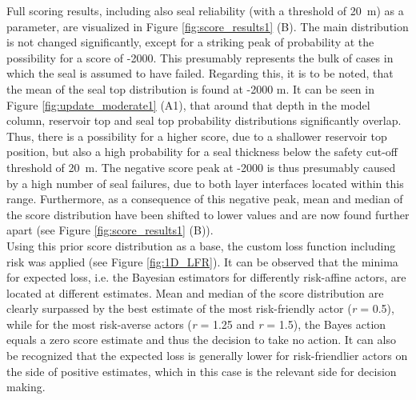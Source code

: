 			Full scoring results, including also seal reliability (with a threshold of 20~m) as a parameter, are visualized in Figure \ref{fig:score_results1} (B). The main distribution is not changed significantly, except for a striking peak of probability at the possibility for a score of -2000. This presumably represents the bulk of cases in which the seal is assumed to have failed. Regarding this, it is to be noted, that the mean of the seal top distribution is found at -2000 m. It can be seen in Figure \ref{fig:update_moderate1} (A1), that around that depth in the model column, reservoir top and seal top probability distributions significantly overlap. Thus, there is a possibility for a higher score, due to a shallower reservoir top position, but also a high probability for a seal thickness below the safety cut-off threshold of 20~m. The negative score peak at -2000 is thus presumably caused by a high number of seal failures, due to both layer interfaces located within this range. Furthermore, as a consequence of this negative peak, mean and median of the score distribution have been shifted to lower values and are now found further apart (see Figure \ref{fig:score_results1} (B)).\\
			Using this prior score distribution as a base, the custom loss function including risk was applied (see Figure \ref{fig:1D_LFR}). It can be observed that the minima for expected loss, i.e. the Bayesian estimators for differently risk-affine actors, are located at different estimates. Mean and median of the score distribution are clearly surpassed by the best estimate of the most risk-friendly actor (\textit{r} = 0.5), while for the most risk-averse actors (\textit{r} = 1.25 and \textit{r} = 1.5), the Bayes action equals a zero score estimate and thus the decision to take no action. It can also be recognized that the expected loss is generally lower for risk-friendlier actors on the side of positive estimates, which in this case is the relevant side for decision making.		
